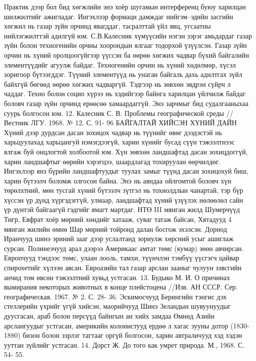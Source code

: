 Практик дээр бол бид хөгжлийн энэ хоёр шугамын интерференц буюу харилцан шилжилтийг ажигладаг. Ингэхлээр формаци дамждаг нийгэм–эдийн засгийн хөгжил нь газар зүйн орчинд явагддаг, тасралттай үйл явц, угсаатны нийлэгжилттэй адилгүй юм. С.В.Калесник хүмүүсийн нэгэн зэрэг амьдардаг газар зүйн болон техногенийн орчны хоорондын ялгааг тодорхой үзүүлсэн. Газар зүйн орчин нь хүний оролцоогүйгээр үүссэн ба өөрөө хөгжих чадвар бүхий байгалийн элементүүдийг агуулж байдаг. Техногенийн орчин нь хүний хөдөлмөр, хүсэл зоригоор бүтээгддэг. Түүний элементүүд нь унаган байгаль дахь адилтгах зүйл байхгүй бөгөөд өөрөө хөгжих чадваргүй. Тэдгээр нь зөвхөн эвдрэн сүйрч л чаддаг. Техно болон социо хүрээ нь хэдийгээр байнга харилцан үйлчилж байдаг боловч газар зүйн орчинд ерөөсөө хамаардаггүй. Энэ зарчмыг бид судалгааныхаа суурь болгосон юм. 12. Калесник С. В. Проблемы географической среды //Вестник ЛГУ. 1968. № 12. С. 91- 96
БАЙГАЛТАЙ ХИЙСЭН ХҮНИЙ ДАЙН
Хүний дээр дурдсан дасан зохицох чадвар нь түүнийг өвөг дээдэстэй нь харьцуулахад харьцангуй нэмэгдээгүй, харин хүнийг бусад сүүн тэжээлтнээс ялгаж буй онцлогтой холбоотой юм. Хүн зөвхөн ландшафтад дасан зохицдоггүй, харин ландшафтыг өөрийн хэрэгцээ, шаардлагад тохируулан өөрчилдөг. Ингэхлээр янз бүрийн ландшафтуудыг туулах замыг түүнд дасан зохицохуй биш, харин бүтээлч боломж олгосон байна. Энэ нь аяндаа ойлгомтой боловч хүн төрөлхтний, мөн тусгай хүний бүтээлч зүтгэл нь тохиолдлын чанартай, тэр бүр хүссэн үр дүнд хүргэдэггүй, улмаар, ландшафтад хүний үзүүлэх нөлөөлөл сайн үр дүнтэй байгаагүй гэдгийг ямагт мартдаг. НТӨ III мянган жилд Шумерчүүд Тигр, Евфрат хоёр мөрний хөндийг хатааж, суваг татаж байсан, Хятадууд 4 мянган жилийн өмнө Шар мөрний тойронд далан босгож эхэлсэн. Дорнод Иранчууд шинэ эриний зааг дээр услалтанд зориулж хөрсний усыг ашиглаж сурсан. Полинезчууд арал дээрээ Америкаас амтат төмс (кумар) зөөн авчирсан. Европчууд тэндээс төмс, улаан лооль, тамхи, түүнчлэн тэмбүү үүсгэгч цайвар спирохетийг хүлээн авсан. Евроазийн тал газар арслан зааныг чулуун зэвсгийн анчид том өвсөн тэжээлтний хувьд устгасан. 13. Будыко М. И. О причинах вымирания некоторых животных в конце плейстоцена //Изв. АН СССР. Сер. географическая. 1967. № 2. С. 28- 36.
Эскимосчууд Берингийн тэнгис дэх стеллерийн үхрийг үгүй хийсэн, маорийчууд Шинэ Зеландын шувуунуудыг дуусгасан, араб болон персүүд байнгын ан хийх замдаа Өмнөд Азийн арслангуудыг устгасан, америкийн колонистууд ердөө л хагас зууны дотор (1830-1880) бизон болон зэрлэг тагтааг оргүй болгосон, харин автраличууд хэд хэдэн ууттан зүйлийг устгасан. 14. Дорст Ж. До того как умрет природа. М., 1968. С. 54- 55.
